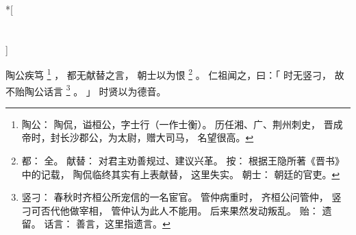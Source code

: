 
\switchcolumn[0]*[\section{}]

陶公疾笃%
\footnote{%
    陶公：
        陶侃，谥桓公，字士行（一作士衡）。
        历任湘、广、荆州刺史，
        晋成帝时，封长沙郡公，为太尉，赠大司马，
        名望很高。
}%
，
都无献替之言，
朝士以为恨%
\footnote{%
    都：
        全。
    献替：
        对君主劝善规过、建议兴革。
        按：
        根据王隐所著《晋书》中的记载，
        陶侃临终其实有上表献替，
        这里失实。
    朝士：
        朝廷的官吏。
}%
。
仁祖闻之，曰：「
    时无竖刁，
    故不贻陶公话言%
    \footnote{%
        竖刁：
            春秋时齐桓公所宠信的一名宦官。
            管仲病重时，
            齐桓公问管仲，
            竖刁可否代他做宰相，
            管仲认为此人不能用。
            后来果然发动叛乱。
        贻：
            遗留。
        话言：
            善言，这里指遗言。
    }%
    。
」
时贤以为德音。

\switchcolumn


